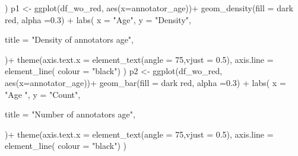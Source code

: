 \documentclass[
]{article}
\newenvironment{Shaded}{\begin{snugshade}}{\end{snugshade}}
\newcommand{\AttributeTok}[1]{\textcolor[rgb]{0.77,0.63,0.00}{#1}}
\newcommand{\DecValTok}[1]{\textcolor[rgb]{0.00,0.00,0.81}{#1}}
\newcommand{\FloatTok}[1]{\textcolor[rgb]{0.00,0.00,0.81}{#1}}
\newcommand{\FunctionTok}[1]{\textcolor[rgb]{0.00,0.00,0.00}{#1}}
\newcommand{\NormalTok}[1]{#1}
\newcommand{\OtherTok}[1]{\textcolor[rgb]{0.56,0.35,0.01}{#1}}
\newcommand{\SpecialCharTok}[1]{\textcolor[rgb]{0.00,0.00,0.00}{#1}}
\newcommand{\StringTok}[1]{\textcolor[rgb]{0.31,0.60,0.02}{#1}}
\begin{document}
\begin{Shaded}
\begin{Highlighting}[]
\NormalTok{    )}
\NormalTok{p1 }\OtherTok{\textless{}{-}} \FunctionTok{ggplot}\NormalTok{(df\_wo\_red, }\FunctionTok{aes}\NormalTok{(}\AttributeTok{x=}\NormalTok{annotator\_age))}\SpecialCharTok{+}
  \FunctionTok{geom\_density}\NormalTok{(}\AttributeTok{fill =} \StringTok{\textquotesingle{}dark red\textquotesingle{}}\NormalTok{, }\AttributeTok{alpha =}\FloatTok{0.3}\NormalTok{) }\SpecialCharTok{+}
  \FunctionTok{labs}\NormalTok{(}
    \AttributeTok{x =} \StringTok{"Age"}\NormalTok{,}
    \AttributeTok{y =} \StringTok{"Density"}\NormalTok{,}
    
    \AttributeTok{title =} \StringTok{"Density of annotators age"}\NormalTok{,}
    
\NormalTok{  )}\SpecialCharTok{+}
  \FunctionTok{theme}\NormalTok{(}\AttributeTok{axis.text.x =} \FunctionTok{element\_text}\NormalTok{(}\AttributeTok{angle =} \DecValTok{75}\NormalTok{,}\AttributeTok{vjust =} \FloatTok{0.5}\NormalTok{),}
        \AttributeTok{axis.line =} \FunctionTok{element\_line}\NormalTok{( }\AttributeTok{colour =} \StringTok{"black"}\NormalTok{)}
\NormalTok{  )}
\NormalTok{p2 }\OtherTok{\textless{}{-}}  \FunctionTok{ggplot}\NormalTok{(df\_wo\_red, }\FunctionTok{aes}\NormalTok{(}\AttributeTok{x=}\NormalTok{annotator\_age))}\SpecialCharTok{+}
  \FunctionTok{geom\_bar}\NormalTok{(}\AttributeTok{fill =} \StringTok{\textquotesingle{}dark red\textquotesingle{}}\NormalTok{, }\AttributeTok{alpha =}\FloatTok{0.3}\NormalTok{) }\SpecialCharTok{+}
  \FunctionTok{labs}\NormalTok{(}
    \AttributeTok{x =} \StringTok{"Age "}\NormalTok{,}
    \AttributeTok{y =} \StringTok{"Count"}\NormalTok{,}
    
    \AttributeTok{title =} \StringTok{"Number of annotators age"}\NormalTok{,}
    
\NormalTok{  )}\SpecialCharTok{+}
  \FunctionTok{theme}\NormalTok{(}\AttributeTok{axis.text.x =} \FunctionTok{element\_text}\NormalTok{(}\AttributeTok{angle =} \DecValTok{75}\NormalTok{,}\AttributeTok{vjust =} \FloatTok{0.5}\NormalTok{),}
        \AttributeTok{axis.line =} \FunctionTok{element\_line}\NormalTok{( }\AttributeTok{colour =} \StringTok{"black"}\NormalTok{)}
\NormalTok{  )}


\end{Highlighting}
\end{Shaded}
\end{document}
